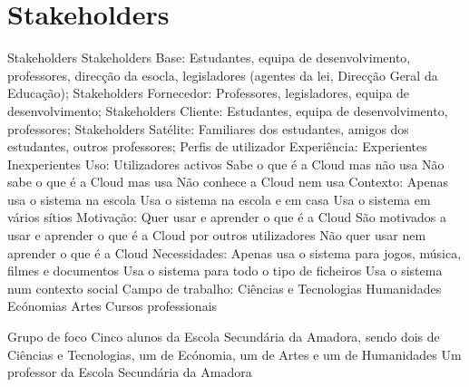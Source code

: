 \chapter{Stakeholders}
\label{chap:stake} 
Stakeholders \newline
Stakeholders Base: Estudantes, equipa de desenvolvimento, professores, direcção da esocla, legisladores (agentes da lei, Direcção Geral da Educação);
\newline
Stakeholders Fornecedor: Professores, legisladores, equipa de desenvolvimento;
\newline
Stakeholders Cliente: Estudantes, equipa de desenvolvimento, professores;
\newline
Stakeholders Satélite: Familiares dos estudantes, amigos dos estudantes, outros professores;
\newline
\newline
Perfis de utilizador\newline
Experiência:\newline
	Experientes\newline
	Inexperientes\newline
Uso:\newline
	Utilizadores activos\newline
	Sabe o que é a Cloud mas não usa\newline
	Não sabe o que é a Cloud mas usa\newline
	Não conhece a Cloud nem usa\newline
Contexto:\newline
	Apenas usa o sistema na escola\newline
	Usa o sistema na escola e em casa\newline
	Usa o sistema em vários sítios\newline
Motivação:\newline
	Quer usar e aprender o que é a Cloud\newline
	São motivados a usar e aprender o que é a Cloud por outros utilizadores\newline
	Não quer usar nem aprender o que é a Cloud\newline
Necessidades:\newline
	Apenas usa o sistema para jogos, música, filmes e documentos\newline
	Usa o sistema para todo o tipo de ficheiros\newline
	Usa o sistema num contexto social\newline
Campo de trabalho:\newline
	Ciências e Tecnologias\newline
	Humanidades\newline
	Ecónomias\newline
	Artes\newline
	Cursos professionais\newline

Grupo de foco\newline
	Cinco alunos da Escola Secundária da Amadora, sendo dois de Ciências e Tecnologias, um de Ecónomia, um de Artes e um de Humanidades \newline
	Um professor da Escola Secundária da Amadora \newline

